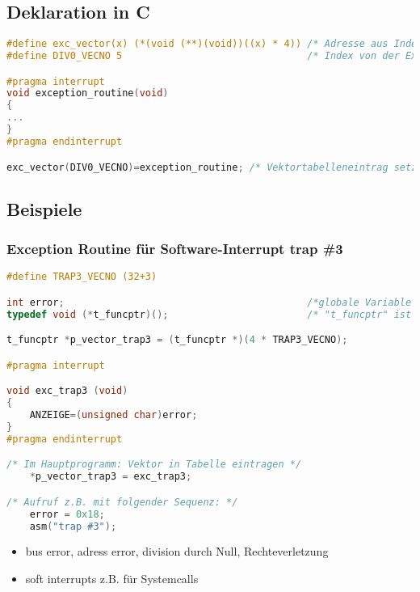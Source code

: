\subsection{Deklaration in C}

\begin{lstlisting}[language=C]
#define exc_vector(x) (*(void (**)(void))((x) * 4)) /* Adresse aus Index berechnen */
#define DIV0_VECNO 5                                /* Index von der Exception Vector Assignment */

#pragma interrupt
void exception_routine(void)
{
...
}
#pragma endinterrupt

exc_vector(DIV0_VECNO)=exception_routine; /* Vektortabelleneintrag setzen exc_div0 ist ein funktionsname*/
\end{lstlisting}

\subsection{Beispiele} 

\subsubsection{Exception Routine für Software-Interrupt trap \#3}

\begin{lstlisting}[language=C]
#define TRAP3_VECNO (32+3)

int error;                                          /*globale Variable fier Zugriff aus Exception Routine*/
typedef void (*t_funcptr)();                        /* "t_funcptr" ist ein Zeiger auf eine Funktion */

t_funcptr *p_vector_trap3 = (t_funcptr *)(4 * TRAP3_VECNO);

#pragma interrupt

void exc_trap3 (void)
{
	ANZEIGE=(unsigned char)error;
}
#pragma endinterrupt

/* Im Hauptprogramm: Vektor in Tabelle eintragen */
	*p_vector_trap3 = exc_trap3;

/* Aufruf z.B. mit folgender Sequenz: */
	error = 0x18;
	asm("trap #3");
\end{lstlisting}

\begin{itemize}
  \item bus error, adress error, division durch Null, Rechteverletzung
  \item soft interrupts z.B. für Systemcalls
\end{itemize}

